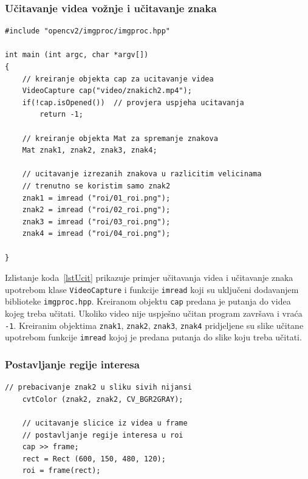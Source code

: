 \newpage
\subsubsection{Učitavanje videa vožnje i učitavanje znaka} %
\label{ssub:Učitavanje videa vožnje i učitavanje znaka}


\begin{lstlisting}[label=lstUcit,caption={Izvorni kod za učitavanje
videa i znaka}]
#include "opencv2/imgproc/imgproc.hpp"

int main (int argc, char *argv[])
{
    // kreiranje objekta cap za ucitavanje videa
    VideoCapture cap("video/znakich2.mp4");
    if(!cap.isOpened())  // provjera uspjeha ucitavanja
        return -1;

    // kreiranje objekta Mat za spremanje znakova
    Mat znak1, znak2, znak3, znak4;

    // ucitavanje izrezanih znakova u razlicitim velicinama
    // trenutno se koristim samo znak2 
    znak1 = imread ("roi/01_roi.png");		
    znak2 = imread ("roi/02_roi.png");
    znak3 = imread ("roi/03_roi.png");
    znak4 = imread ("roi/04_roi.png");

}
\end{lstlisting}

Izlistanje koda~\ref{lstUcit} prikazuje primjer učitavanja videa i
učitavanje znaka upotrebom klase \texttt{VideoCapture} i funkcije
\texttt{imread} koji su uključeni dodavanjem biblioteke
\texttt{imgproc.hpp}. Kreiranom objektu \texttt{cap} predana je putanja
do videa kojeg treba učitati. Ukoliko video nije uspješno učitan program
završava i vraća \texttt{-1}. Kreiranim objektima \texttt{znak1},
\texttt{znak2}, \texttt{znak3}, \texttt{znak4} pridjeljene su slike
učitane upotrebom funkcije \texttt{imread} kojoj je predana putanja do
slike koju treba učitati.


\subsubsection{Postavljanje regije interesa} %
\label{ssub:Postavljanje regije interesa}


\begin{lstlisting}[label=lstRoi,caption={Izvorni kod za postvljanje
regije interesa}]
	// prebacivanje znak2 u sliku sivih nijansi
	cvtColor (znak2, znak2, CV_BGR2GRAY);
	
	// ucitavanje slicice iz videa u frame
	// postavljanje regije interesa u roi
	cap >> frame;
	rect = Rect (600, 150, 480, 120);
    roi = frame(rect);
	
\end{lstlisting}


